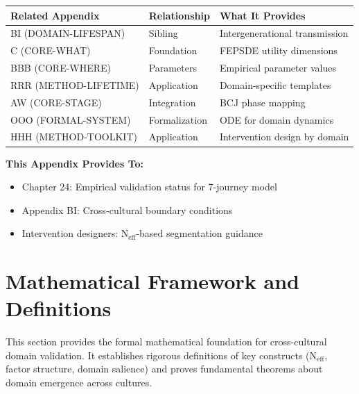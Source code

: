 \begin{tcolorbox}[colback=gray!5!white, colframe=gray!75!black, title=Cross-Reference Map]
\small
\begin{tabular}{@{}lll@{}}
\toprule
\textbf{Related Appendix} & \textbf{Relationship} & \textbf{What It Provides} \\
\midrule
BI (DOMAIN-LIFESPAN) & Sibling & Intergenerational transmission \\
C (CORE-WHAT) & Foundation & FEPSDE utility dimensions \\
BBB (CORE-WHERE) & Parameters & Empirical parameter values \\
RRR (METHOD-LIFETIME) & Application & Domain-specific templates \\
AW (CORE-STAGE) & Integration & BCJ phase mapping \\
OOO (FORMAL-SYSTEM) & Formalization & ODE for domain dynamics \\
HHH (METHOD-TOOLKIT) & Application & Intervention design by domain \\
\bottomrule
\end{tabular}

\vspace{0.5em}
\textbf{This Appendix Provides To:}
\begin{itemize}[nosep]
\item Chapter 24: Empirical validation status for 7-journey model
\item Appendix BI: Cross-cultural boundary conditions
\item Intervention designers: N$_{\text{eff}}$-based segmentation guidance
\end{itemize}
\end{tcolorbox}


\section{Mathematical Framework and Definitions}
\label{sec:bj-mathframework}

\begin{tcolorbox}[colback=blue!5!white, colframe=blue!75!black, title=Purpose of This Section]
This section provides the formal mathematical foundation for cross-cultural domain validation.
It establishes rigorous definitions of key constructs (N$_{\text{eff}}$, factor structure, domain
salience) and proves fundamental theorems about domain emergence across cultures.
\end{tcolorbox}

